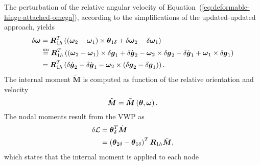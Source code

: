 \documentclass[10pt,dvips,fleqn,subeqn]{report}
\newcommand{\T}[1]{\boldsymbol{#1}}
\newcommand{\TT}[1]{\boldsymbol{#1}}
\newcommand{\equu}{\overset{\text{uu}}{=}}
\begin{document}
\begin{comment}
The relative angular velocity stems from the time derivative
of $\TT{R}_{1h}^T\TT{R}_{2h}$
\begin{equation}
	\T{\omega} = \T{R}_{1h}^T\plbr{\T{\omega}_2 - \T{\omega}_1} ;
	\label{eq:deformable-hinge-attached-omega}
\end{equation}
in fact, the time derivative of the relative orientation yields
\begin{align}
	\T{\omega} \times{}
	&= \frac{\mathrm{d}}{\mathrm{d}t}\plbr{\T{R}_{1h}^T \T{R}_{2h}}\plbr{\T{R}_{1h}^T \T{R}_{2h}}^T \\
	&= \plbr{\dot{\T{R}}_{1h}^T \T{R}_{2h} + \T{R}_{1h}^T \dot{\T{R}}_{2h}} \T{R}_{2h}^T \T{R}_{1h} \\
	&= \T{R}_{1h}^T \T{\omega}_1 \times{}^T \T{R}_{1h} + \T{R}_{1h}^T \T{\omega}_2 \times \T{R}_{1h} \\
	&= \T{R}_{1h}^T \plbr{\T{\omega}_2 - \T{\omega}_1} \times \T{R}_{1h}
\end{align}
\end{comment}
The perturbation of the relative angular velocity
of Equation~(\ref{eq:deformable-hinge-attached-omega}),
according to the simplifications of the updated-updated approach, yields
\begin{align}
	\delta\T{\omega} &= \T{R}_{1h}^T\plbr{
		\plbr{\T{\omega}_2 - \T{\omega}_1} \times \T{\theta}_{1\delta}
		+ \delta\T{\omega}_2
		- \delta\T{\omega}_1
	} \\
	&\equu \T{R}_{1h}^T\plbr{
		\plbr{\T{\omega}_2 - \T{\omega}_1} \times \delta\T{g}_1
		+ \delta\dot{\T{g}}_2 - \T{\omega}_2 \times \delta\T{g}_2
		- \delta\dot{\T{g}}_1 + \T{\omega}_1 \times \delta\T{g}_1
	} \\
	&= \T{R}_{1h}^T\plbr{
		\delta\dot{\T{g}}_2
		- \delta\dot{\T{g}}_1
		- \T{\omega}_2 \times \plbr{\delta\T{g}_2 - \delta\T{g}_1}
	} .
\end{align}
The internal moment $\tilde{\T{M}}$ is computed as function
of the relative orientation and velocity
\begin{equation}
	\tilde{\T{M}} = \tilde{\T{M}}\plbr{\T{\theta}, \T{\omega}} .
\end{equation}
The nodal moments result from the VWP as
\begin{align}
	\delta\mathcal{L} &= \T{\theta}_{\delta}^T \tilde{\T{M}} \\
	&= \plbr{
		\T{\theta}_{2\delta} - \T{\theta}_{1\delta}
	}^T \T{R}_{1h} \tilde{\T{M}} ,
\end{align}
which states that the internal moment is applied to each node 
\end{document}
